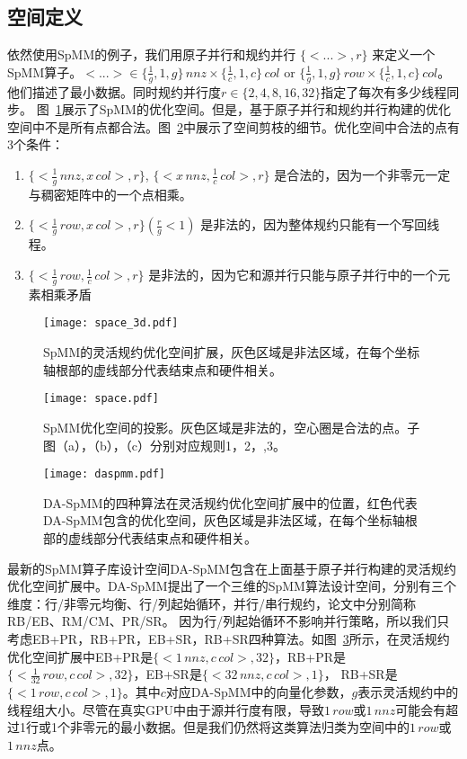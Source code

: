 \subsection{空间定义}\label{sec:spacedef}
依然使用SpMM的例子，我们用原子并行和规约并行 $\{<...>,r\}$ 来定义一个SpMM算子。$<...>\in \{\frac{1}{g},1,g\}\, nnz \times \{\frac{1}{c},1,c\}\, col $ or $\{\frac{1}{g},1,g\}\,row \times \{\frac{1}{c},1,c\}\,col$。他们描述了最小数据。同时规约并行度$r\in\{2,4,8,16,32\}$指定了每次有多少线程同步。 
图~\ref{fig:space3d}展示了SpMM的优化空间。但是，基于原子并行和规约并行构建的优化空间中不是所有点都合法。图~\ref{fig:space}中展示了空间剪枝的细节。优化空间中合法的点有3个条件：
\begin{enumerate}
  \item $\{<\frac{1}{g}\,nnz , x\,col>,r\}$, $\{<x\,nnz , \frac{1}{c}\,col>,r\}$ 
  是合法的，因为一个非零元一定与稠密矩阵中的一个点相乘。
  \item $\{<\frac{1}{g}\,row, x\,col>,r\}(\frac{r}{g}<1)$
  是非法的，因为整体规约只能有一个写回线程。
  \item $\{<\frac{1}{g}\,row , \frac{1}{c}\,col>,r\}$
  是非法的，因为它和源并行只能与原子并行中的一个元素相乘矛盾
\end{enumerate}
\begin{figure}[h]%
  \centering
  \texttt{[image: space\_3d.pdf]}
  \caption{SpMM的灵活规约优化空间扩展，灰色区域是非法区域，在每个坐标轴根部的虚线部分代表结束点和硬件相关。}
  \label{fig:space3d}
\end{figure}
\begin{figure}[h]%
  \centering
  \texttt{[image: space.pdf]}
  \caption{SpMM优化空间的投影。灰色区域是非法的，空心圈是合法的点。子图（a），（b），（c）分别对应规则1，2，,3。}
  \label{fig:space}
\end{figure}
\begin{figure}[h]%
  \centering
  \texttt{[image: daspmm.pdf]}
  \caption{DA-SpMM的四种算法在灵活规约优化空间扩展中的位置，红色代表DA-SpMM包含的优化空间，灰色区域是非法区域，在每个坐标轴根部的虚线部分代表结束点和硬件相关。}
  \label{fig:daspmm}
\end{figure}
最新的SpMM算子库设计空间DA-SpMM包含在上面基于原子并行构建的灵活规约优化空间扩展中。DA-SpMM提出了一个三维的SpMM算法设计空间，分别有三个维度：行/非零元均衡、行/列起始循环，并行/串行规约，论文中分别简称RB/EB、RM/CM、PR/SR。
因为行/列起始循环不影响并行策略，所以我们只考虑EB+PR，RB+PR，EB+SR，RB+SR四种算法。如图~\ref{fig:daspmm}所示，在灵活规约优化空间扩展中EB+PR是$\{<1\,nnz , c\,col>,32\}$，RB+PR是$\{<\frac{1}{32}\,row, c\,col>,32\}$，EB+SR是$\{<32\,nnz,c\,col >,1\}$，
RB+SR是$\{<1\,row,c\,col >,1\}$。其中$c$对应DA-SpMM中的向量化参数，$g$表示灵活规约中的线程组大小。尽管在真实GPU中由于源并行度有限，导致$1\,row$或$1\,nnz$可能会有超过1行或1个非零元的最小数据。但是我们仍然将这类算法归类为空间中的$1\,row$或$1\,nnz$点。


